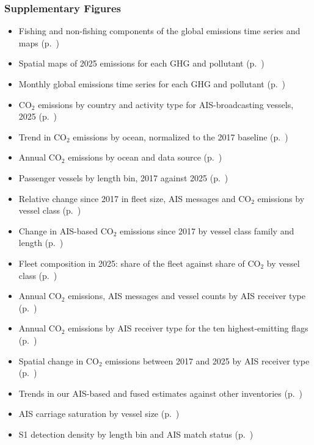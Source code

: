 \subsubsection*{Supplementary Figures}
\begin{itemize}\setlength{\itemsep}{0pt}
    \item[1.] Fishing and non-fishing components of the global emissions time series and maps (p.~\pageref{fig:fig-spatial-temporal-richness-by-fleet-total-pseudolog})
    \item[2.] Spatial maps of 2025 emissions for each GHG and pollutant (p.~\pageref{fig:fig-pollutant-maps})
    \item[3.] Monthly global emissions time series for each GHG and pollutant (p.~\pageref{fig:fig-pollutant-time-series})
    \item[4.] CO$_{2}$ emissions by country and activity type for AIS-broadcasting vessels, 2025 (p.~\pageref{fig:fig-emissions-by-country-and-activity-type})
    \item[5.] Trend in CO$_{2}$ emissions by ocean, normalized to the 2017 baseline (p.~\pageref{fig:fig-emissions-marine-ocean-other})
    \item[6.] Annual CO$_{2}$ emissions by ocean and data source (p.~\pageref{fig:fig-annual-emissions-by-ocean-and-data-source})
    \item[7.] Passenger vessels by length bin, 2017 against 2025 (p.~\pageref{fig:figS-passenger-size-panels})
    \item[8.] Relative change since 2017 in fleet size, AIS messages and CO$_{2}$ emissions by vessel class (p.~\pageref{fig:figS-fleet-growth-by-year})
    \item[9.] Change in AIS-based CO$_{2}$ emissions since 2017 by vessel class family and length (p.~\pageref{fig:figS-growth-timeline-by-family-length})
    \item[10.] Fleet composition in 2025: share of the fleet against share of CO$_{2}$ by vessel class (p.~\pageref{fig:figS-fleet-sankey-with-series-2025})
    \item[11.] Annual CO$_{2}$ emissions, AIS messages and vessel counts by AIS receiver type (p.~\pageref{fig:fig-annual-emissions-by-ais-receiver-type})
    \item[12.] Annual CO$_{2}$ emissions by AIS receiver type for the ten highest-emitting flags (p.~\pageref{fig:fig-annual-emissions-by-ais-receiver-type-top-flags})
    \item[13.] Spatial change in CO$_{2}$ emissions between 2017 and 2025 by AIS receiver type (p.~\pageref{fig:fig-co2-emissions-change-map-by-receiver-type})
    \item[14.] Trends in our AIS-based and fused estimates against other inventories (p.~\pageref{fig:figS-inventory-comparison-all-sources})
    \item[15.] AIS carriage saturation by vessel size (p.~\pageref{fig:figS-ais-carriage-saturation-by-size})
    \item[16.] S1 detection density by length bin and AIS match status (p.~\pageref{fig:figS-density-by-match-status})
\end{itemize}

